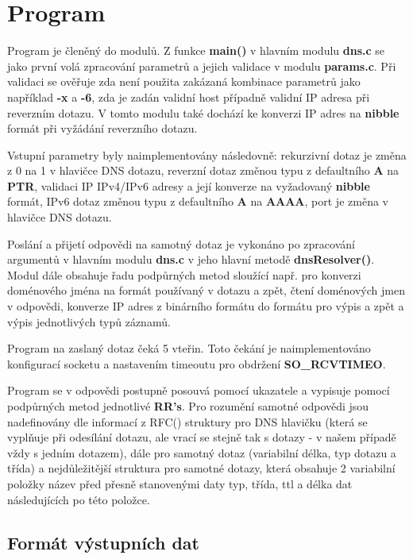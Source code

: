 \documentclass[a4paper,11pt]{article}
\begin{document}
\section{Program}

Program je členěný do modulů. Z funkce \textbf{main()} v hlavním modulu \textbf{dns.c} se jako první volá zpracování parametrů a jejich validace v modulu \textbf{params.c}. Při validaci se ověřuje zda není použita zakázaná kombinace parametrů jako například \textbf{-x} a \textbf{-6}, zda je zadán validní host případně validní IP adresa při reverzním dotazu. V tomto modulu také dochází ke konverzi IP adres na \textbf{nibble} formát při vyžádání reverzního dotazu.

Vstupní parametry byly naimplementovány následovně: rekurzivní dotaz je změna z 0 na 1 v hlavičce DNS dotazu, reverzní dotaz změnou typu z defaultního \textbf{A} na \textbf{PTR}, validaci IP IPv4/IPv6 adresy a její konverze na vyžadovaný \textbf{nibble} formát, IPv6 dotaz změnou typu z defaultního \textbf{A} na \textbf{AAAA}, port je změna v hlavičce DNS dotazu.

Poslání a přijetí odpovědi na samotný dotaz je vykonáno po zpracování argumentů v hlavním modulu \textbf{dns.c} v jeho hlavní metodě \textbf{dnsResolver()}. Modul dále obsahuje řadu podpůrných metod sloužící např. pro konverzi doménového jména na formát používaný v dotazu a zpět, čtení doménových jmen v odpovědi, konverze IP adres z binárního formátu do formátu pro výpis a zpět a výpis jednotlivých typů záznamů.

Program na zaslaný dotaz čeká 5 vteřin. Toto čekání je naimplementováno konfigurací socketu a nastavením timeoutu pro obdržení \textbf{SO\_RCVTIMEO}.

Program se v odpovědi postupně posouvá pomocí ukazatele a vypisuje pomocí podpůrných metod jednotlivé \textbf{RR's}. Pro rozumění samotné odpovědi jsou nadefinovány dle informací z RFC(\cite{rfc10135}) struktury pro DNS hlavičku (která se vyplňuje při odesílání dotazu, ale vrací se stejně tak s dotazy - v našem případě vždy s jedním dotazem), dále pro samotný dotaz (variabilní délka, typ dotazu a třída) a nejdůležitější struktura pro samotné dotazy, která obsahuje 2 variabilní položky název před přesně stanovenými daty typ, třída, ttl a délka dat následujících po této položce. 

\subsection{Formát výstupních dat}
\end{document}
